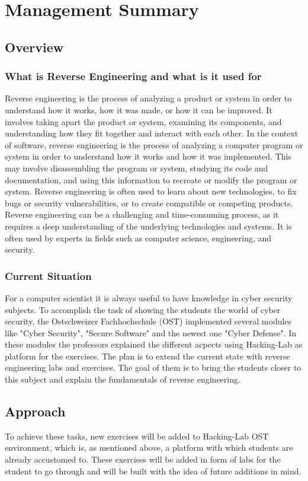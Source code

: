 \chapter{Management Summary}
\section{Overview}
\subsection{What is Reverse Engineering and what is it used for}
Reverse engineering is the process of analyzing a product or system in order to understand how it works, how it was made, or how it can be improved. It involves taking apart the product or system, examining its components, and understanding how they fit together and interact with each other.
In the context of software, reverse engineering is the process of analyzing a computer program or system in order to understand how it works and how it was implemented. This may involve disassembling the program or system, studying its code and documentation, and using this information to recreate or modify the program or system. Reverse engineering is often used to learn about new technologies, to fix bugs or security vulnerabilities, or to create compatible or competing products.
Reverse engineering can be a challenging and time-consuming process, as it requires a deep understanding of the underlying technologies and systems. It is often used by experts in fields such as computer science, engineering, and security. 

\subsection{Current Situation}
For a computer scientist it is always useful to have knowledge in cyber security subjects. To accomplish the task of showing the students the world of cyber security, the Ostschweizer Fachhochschule (OST) implemented several modules like "Cyber Security", "Secure Software" and the newest one "Cyber Defense". In these modules the professors explained the different acpects using Hacking-Lab as platform for the exercises. The plan is to extend the current state with reverse engineering labs and exercises. The goal of them is to bring the students closer to this subject and explain the fundamentals of reverse engineering.

\section{Approach}
To achieve these tasks, new exercises will be added to Hacking-Lab OST environment, which is, as mentioned above, a platform with which students are already accustomed to. These exercises will be added in form of labs for the student to go through and will be built with the idea of future additions in mind.

